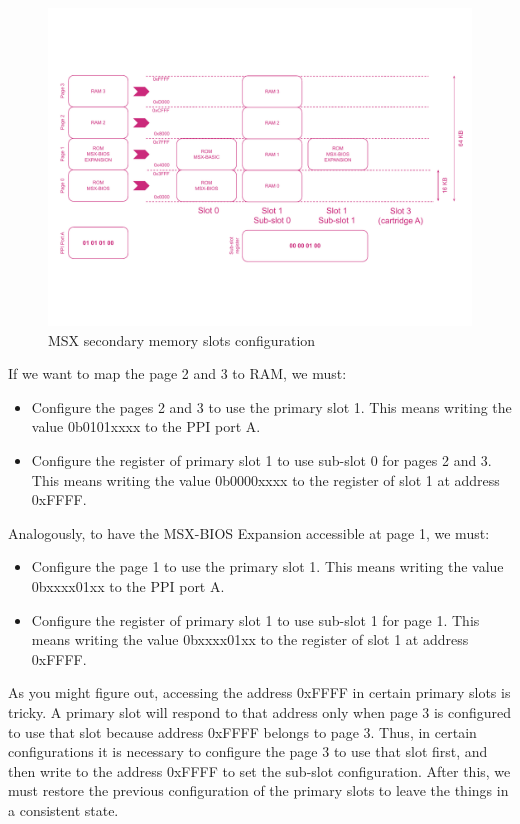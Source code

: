 \begin{figure}
	\centering
	\includegraphics[width=1\linewidth,trim={0cm 100 0 80}]{images/figures/msx-mem-slotssec}
	\caption{MSX secondary memory slots configuration}
	\label{fig:msx-mem-slotssec}
\end{figure}

If we want to map the page 2 and 3 to RAM, we must:
\begin{itemize}
	\item Configure the pages 2 and 3 to use the primary slot 1. This means writing the value 0b0101xxxx to the PPI port A.
	\item Configure the register of primary slot 1 to use sub-slot 0 for pages 2 and 3. This means writing the value 0b0000xxxx to the register of slot 1 at address 0xFFFF.
\end{itemize}

Analogously, to have the MSX-BIOS Expansion accessible at page 1, we must:

\begin{itemize}
	\item Configure the page 1 to use the primary slot 1. This means writing the value 0bxxxx01xx to the PPI port A.
	\item Configure the register of primary slot 1 to use sub-slot 1 for page 1. This means writing the value 0bxxxx01xx to the register of slot 1 at address 0xFFFF.
\end{itemize}

As you might figure out, accessing the address 0xFFFF in certain primary slots is tricky. A primary slot will respond to that address only when page 3 is configured to use that slot because address 0xFFFF belongs to page 3. Thus, in certain configurations it is necessary to configure the page 3 to use that slot first, and then write to the address 0xFFFF to set the sub-slot configuration. After this, we must restore the previous configuration of the primary slots to leave the things in a consistent state. 

